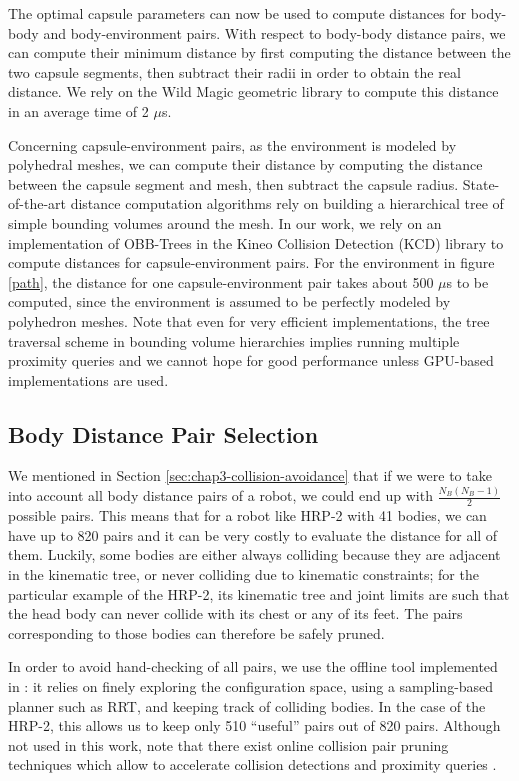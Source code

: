 The optimal capsule parameters can now be used to compute distances
for body-body and body-environment pairs. With respect to body-body
distance pairs, we can compute their minimum distance by first
computing the distance between the two capsule segments, then subtract
their radii in order to obtain the real distance. We rely on the Wild
Magic geometric library \cite{schneider2003geometric, wildmagic} to
compute this distance in an average time of 2 $\mu$s.

Concerning capsule-environment pairs, as the environment is modeled by
polyhedral meshes, we can compute their distance by computing the
distance between the capsule segment and mesh, then subtract the
capsule radius. State-of-the-art distance computation algorithms rely
on building a hierarchical tree of simple bounding volumes around the
mesh. In our work, we rely on an implementation of OBB-Trees in the
Kineo Collision Detection (KCD) library to compute distances for
capsule-environment pairs. For the environment in figure \ref{path},
the distance for one capsule-environment pair takes about 500 $\mu$s
to be computed, since the environment is assumed to be perfectly
modeled by polyhedron meshes. Note that even for very efficient
implementations, the tree traversal scheme in bounding volume
hierarchies implies running multiple proximity queries and we cannot
hope for good performance unless GPU-based implementations are used.

\subsection{Body Distance Pair Selection}

We mentioned in Section \ref{sec:chap3-collision-avoidance} that if we
were to take into account all body distance pairs of a robot, we could
end up with $\frac{N_B(N_B - 1)}{2}$ possible pairs. This means that
for a robot like HRP-2 with 41 bodies, we can have up to 820 pairs and
it can be very costly to evaluate the distance for all of
them. Luckily, some bodies are either always colliding because they
are adjacent in the kinematic tree, or never colliding due to
kinematic constraints; for the particular example of the HRP-2, its
kinematic tree and joint limits are such that the head body can never
collide with its chest or any of its feet. The pairs corresponding to
those bodies can therefore be safely pruned.

In order to avoid hand-checking of all pairs, we use the offline tool
implemented in \cite{planning-environment}: it relies on finely
exploring the configuration space, using a sampling-based planner such
as RRT, and keeping track of colliding bodies. In the case of the
HRP-2, this allows us to keep only 510 ``useful'' pairs out of 820
pairs. Although not used in this work, note that there exist online
collision pair pruning techniques which allow to accelerate collision
detections and proximity queries \cite{ericson2004real}.

